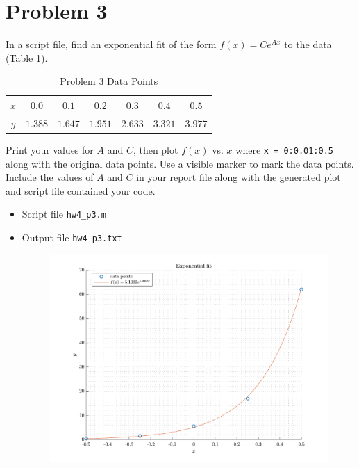 \section{Problem 3}%
\label{sec:problem_3}
In a script file, find  an exponential fit of the form $f(x) = C e^{Ax}$ to the data (Table \ref{tab:p3}).
\begin{table}[!hbtp]
  \centering
  \caption{Problem 3 Data Points}
  \label{tab:p3}
  \begin{tabular}{ccccccc}
    \toprule
    $x$ & $0.0$   & $0.1$   & $0.2$   & $0.3$   & $0.4$   & $0.5$ \\
    \midrule
    $y$ & $1.388$ & $1.647$ & $1.951$ & $2.633$ & $3.321$ & $3.977$ \\
    \bottomrule
  \end{tabular}
\end{table}
Print your values for $A$ and $C$, then plot $f(x)$ vs. $x$ where \verb|x = 0:0.01:0.5| along with the original data points. Use a visible marker to mark the data points. Include the values of $A$ and $C$ in your report file along with the generated  plot and script file contained your code.
\begin{solution}
  \quad
  \begin{itemize}
    \item
      Script file \verb|hw4_p3.m|
      
    \item
      Output file \verb|hw4_p3.txt|
      
      \begin{figure}[!hbtp]
        \centering
        \includegraphics[width=0.8\linewidth]{../src/hw4_p3.pdf}
        \caption{}%
        \label{fig:}
      \end{figure}
  \end{itemize}
\end{solution}


